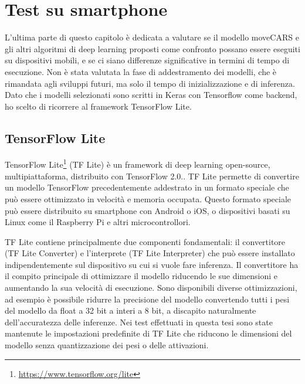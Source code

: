 \documentclass[12pt,italian]{report}
\begin{document}
\section{Test su smartphone} \label{sec:smartphone}
L'ultima parte di questo capitolo è dedicata a valutare se il modello moveCARS e gli altri algoritmi di deep learning proposti come confronto possano essere eseguiti su dispositivi mobili, e se ci siano differenze significative in termini di tempo di esecuzione. Non è stata valutata la fase di addestramento dei modelli, che è rimandata agli sviluppi futuri, ma solo il tempo di inizializzazione e di inferenza. Dato che i modelli selezionati sono scritti in Keras con Tensorflow come backend, ho scelto di ricorrere al framework TensorFlow Lite. 

\subsection{TensorFlow Lite}
TensorFlow Lite\footnote{\url{https://www.tensorflow.org/lite}} (TF Lite) è un framework di deep learning open-source, multipiattaforma, distribuito con TensorFlow 2.0.. TF Lite permette di convertire un modello TensorFlow precedentemente addestrato in un formato speciale che può essere ottimizzato in velocità e memoria occupata. Questo formato speciale può essere distribuito su smartphone con Android o iOS, o dispositivi basati su Linux come il Raspberry Pi e altri microcontrollori.

TF Lite contiene principalmente due componenti fondamentali:  il convertitore (TF Lite Converter) e l’interprete (TF Lite Interpreter) che può essere installato indipendentemente sul dispositivo su cui si vuole fare inferenza.  Il convertitore ha il compito principale di ottimizzare il modello riducendo le sue dimensioni e aumentando la sua velocità di esecuzione. Sono disponibili diverse ottimizzazioni, ad esempio è possibile ridurre la precisione del modello convertendo tutti i pesi del modello da float a 32 bit a interi a 8 bit, a discapito naturalmente dell'accuratezza delle inferenze. Nei test effettuati in questa tesi sono state mantenute le impostazioni predefinite di TF Lite che riducono le dimensioni del modello senza quantizzazione dei pesi o delle attivazioni.
\end{document}
